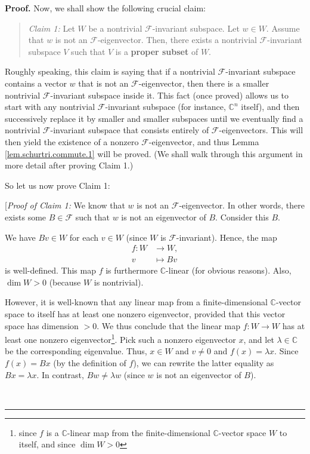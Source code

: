 \documentclass[numbers=enddot,12pt,final,onecolumn,notitlepage]{scrartcl}%
\numberwithin{exer}{subsection}
\theoremstyle{definition}
\newenvironment{statement}{\begin{quote}}{\end{quote}}
\newenvironment{proof}[1][Proof]{\noindent\textbf{#1.} }{\ \rule{0.5em}{0.5em}}
\begin{document}
\begin{proof}
Now, we shall show the following crucial claim:

\begin{statement}
\textit{Claim 1:} Let $W$ be a nontrivial $\mathcal{F}$-invariant subspace.
Let $w\in W$. Assume that $w$ is not an $\mathcal{F}$-eigenvector. Then, there
exists a nontrivial $\mathcal{F}$-invariant subspace $V$ such that $V$ is a
\textbf{proper subset} of $W$.
\end{statement}

Roughly speaking, this claim is saying that if a nontrivial $\mathcal{F}%
$-invariant subspace contains a vector $w$ that is not an $\mathcal{F}%
$-eigenvector, then there is a smaller nontrivial $\mathcal{F}$-invariant
subspace inside it. This fact (once proved) allows us to start with any
nontrivial $\mathcal{F}$-invariant subspace (for instance, $\mathbb{C}^{n}$
itself), and then successively replace it by smaller and smaller subspaces
until we eventually find a nontrivial $\mathcal{F}$-invariant subspace that
consists entirely of $\mathcal{F}$-eigenvectors. This will then yield the
existence of a nonzero $\mathcal{F}$-eigenvector, and thus Lemma
\ref{lem.schurtri.commute.1} will be proved. (We shall walk through this
argument in more detail after proving Claim 1.)

So let us now prove Claim 1:

[\textit{Proof of Claim 1:} We know that $w$ is not an $\mathcal{F}%
$-eigenvector. In other words, there exists some $B\in\mathcal{F}$ such that
$w$ is not an eigenvector of $B$. Consider this $B$.

We have $Bv\in W$ for each $v\in W$ (since $W$ is $\mathcal{F}$-invariant).
Hence, the map%
\begin{align*}
f:W  &  \rightarrow W,\\
v  &  \mapsto Bv
\end{align*}
is well-defined. This map $f$ is furthermore $\mathbb{C}$-linear (for obvious
reasons). Also, $\dim W>0$ (because $W$ is nontrivial).

However, it is well-known that any linear map from a finite-dimensional
$\mathbb{C}$-vector space to itself has at least one nonzero eigenvector,
provided that this vector space has dimension $>0$. We thus conclude that the
linear map $f:W\rightarrow W$ has at least one nonzero
eigenvector\footnote{since $f$ is a $\mathbb{C}$-linear map from the
finite-dimensional $\mathbb{C}$-vector space $W$ to itself, and since $\dim
W>0$}. Pick such a nonzero eigenvector $x$, and let $\lambda\in\mathbb{C}$ be
the corresponding eigenvalue. Thus, $x\in W$ and $v\neq0$ and $f\left(
x\right)  =\lambda x$. Since $f\left(  x\right)  =Bx$ (by the definition of
$f$), we can rewrite the latter equality as $Bx=\lambda x$. In contrast,
$Bw\neq\lambda w$ (since $w$ is not an eigenvector of $B$).


\end{proof}
\end{document}
